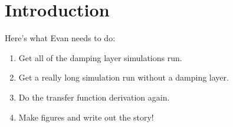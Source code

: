 \section{Introduction}
\label{sec:introduction}

Here's what Evan needs to do:

\begin{enumerate}
\item Get all of the damping layer simulations run.
\item Get a really long simulation run without a damping layer.
\item Do the transfer function derivation again.
\item Make figures and write out the story!
\end{enumerate}
